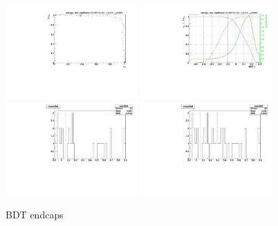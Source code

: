 \begin{figure}
  \centering
  \includegraphics[width=0.45\textwidth]{Figures/bdt/BDT_endcaps_roc}
  \includegraphics[width=0.45\textwidth]{Figures/bdt/BDT_endcaps_eff} \\
  \includegraphics[width=0.45\textwidth]{Figures/bdt/BDT_endcaps_mass}
  \includegraphics[width=0.45\textwidth]{Figures/bdt/BDT_endcaps_mass_unblind}
\caption{BDT endcaps}
\end{figure}


